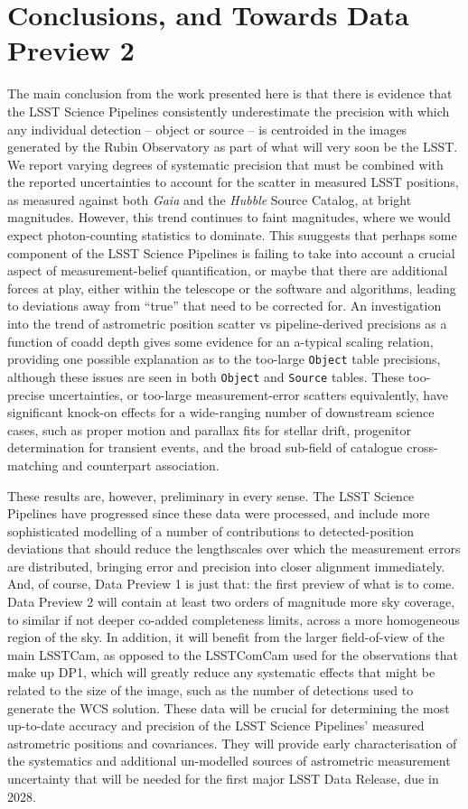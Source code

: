 \documentclass[SE,lsstdraft,authoryear,toc]{lsstdoc}
\begin{document}
\section{Conclusions, and Towards Data Preview 2}
The main conclusion from the work presented here is that there is evidence that the LSST Science Pipelines consistently underestimate the precision with which any individual detection -- object or source -- is centroided in the images generated by the Rubin Observatory as part of what will very soon be the LSST.
We report varying degrees of systematic precision that must be combined with the reported uncertainties to account for the scatter in measured LSST positions, as measured against both \textit{Gaia} and the \textit{Hubble} Source Catalog, at bright magnitudes.
However, this trend continues to faint magnitudes, where we would expect photon-counting statistics to dominate.
This suuggests that perhaps some component of the LSST Science Pipelines is failing to take into account a crucial aspect of measurement-belief quantification, or maybe that there are additional forces at play, either within the telescope or the software and algorithms, leading to deviations away from ``true'' that need to be corrected for.
An investigation into the trend of astrometric position scatter vs pipeline-derived precisions as a function of coadd depth gives some evidence for an a-typical scaling relation, providing one possible explanation as to the too-large \texttt{Object} table precisions, although these issues are seen in both \texttt{Object} and \texttt{Source} tables.
These too-precise uncertainties, or too-large measurement-error scatters equivalently, have significant knock-on effects for a wide-ranging number of downstream science cases, such as proper motion and parallax fits for stellar drift, progenitor determination for transient events, and the broad sub-field of catalogue cross-matching and counterpart association.

These results are, however, preliminary in every sense.
The LSST Science Pipelines have progressed since these data were processed, and include more sophisticated modelling of a number of contributions to detected-position deviations that should reduce the lengthscales over which the measurement errors are distributed, bringing error and precision into closer alignment immediately.
And, of course, Data Preview 1 is just that: the first preview of what is to come.
Data Preview 2 will contain at least two orders of magnitude more sky coverage, to similar if not deeper co-added completeness limits, across a more homogeneous region of the sky.
In addition, it will benefit from the larger field-of-view of the main LSSTCam, as opposed to the LSSTComCam used for the observations that make up DP1, which will greatly reduce any systematic effects that might be related to the size of the image, such as the number of detections used to generate the WCS solution.
These data will be crucial for determining the most up-to-date accuracy and precision of the LSST Science Pipelines' measured astrometric positions and covariances.
They will provide early characterisation of the systematics and additional un-modelled sources of astrometric measurement uncertainty that will be needed for the first major LSST Data Release, due in 2028.
\end{document}
